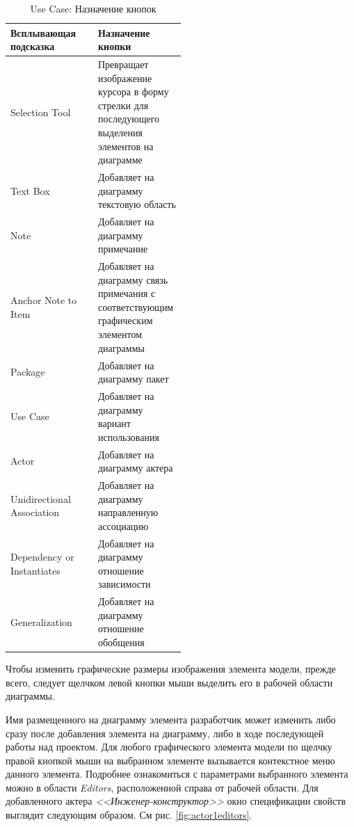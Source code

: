 \documentclass[a4paper,12pt]{report}
\begin{document}
\newpage
\begin{table}[htbp]
	
	\begin{center}
		\begin{tabular}{|l|m{0.5\linewidth}|}
		\hline
		\textbf{Всплывающая подсказка} & \textbf{Назначение кнопки} \\ \hline
		Selection Tool & Превращает изображение курсора в форму стрелки для последующего выделения элементов на диаграмме \\ \hline
		Text Box & Добавляет на диаграмму текстовую область \\ \hline
		Note & Добавляет на диаграмму примечание \\ \hline
		Anchor Note to Item & Добавляет на диаграмму связь примечания с соответствующим графическим элементом диаграммы \\ \hline
		Package & Добавляет на диаграмму пакет \\ \hline
		Use Case & Добавляет на диаграмму вариант использования \\ \hline
		Actor & Добавляет на диаграмму актера \\ \hline
		Unidirectional Association & Добавляет на диаграмму направленную ассоциацию \\ \hline
		Dependency or Instantiates & Добавляет на диаграмму отношение зависимости \\ \hline
		Generalization & Добавляет на диаграмму отношение обобщения \\ \hline
	\end{tabular}
	\end{center}
	\label{tab:toolboxusecase}
	\caption{Use Case: Назначение кнопок}
\end{table}
Чтобы изменить графические размеры изображения элемента модели, прежде всего, следует щелчком левой кнопки мыши выделить его в рабочей области диаграммы.

Имя размещенного на диаграмму элемента разработчик может изменить либо сразу после добавления элемента на диаграмму, либо в ходе последующей работы над проектом. Для любого графического элемента модели по щелчку правой кнопкой мыши на выбранном элементе вызывается контекстное меню данного элемента. Подробнее ознакомиться с параметрами выбранного элемента можно в области \textit{Editors}, расположенной справа от рабочей области. Для добавленного актера \textit{<<Инженер-конструктор>>} окно спецификации свойств выглядит следующим образом. См рис. \ref{fig:actor1editors}.
\end{document}

